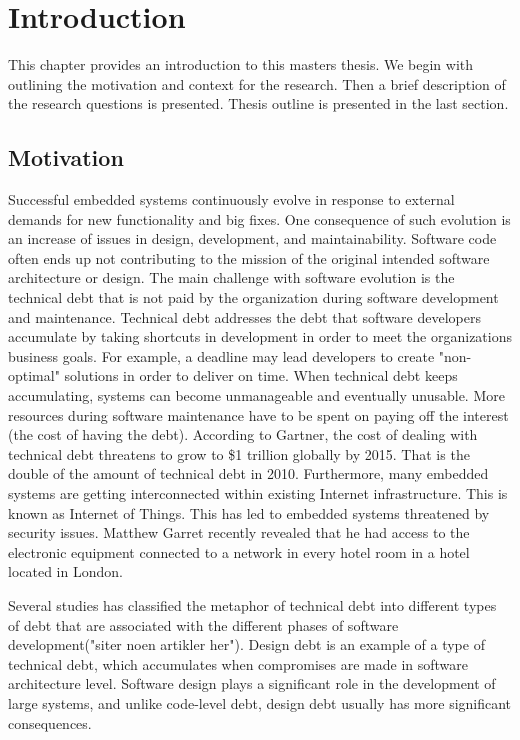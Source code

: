 
\chapter{Introduction}

This chapter provides an introduction to this masters thesis. We begin with outlining the motivation and context for the research. Then a brief description of the research questions is presented. Thesis outline is presented in the last section.


\section{Motivation}
Successful embedded systems continuously evolve in response to external demands for new functionality and big fixes\cite{graaf2003embedded}. One consequence of such evolution is an increase of issues in design, development, and maintainability\cite{7381510}. Software code often ends up not contributing to the mission of the original intended software architecture or design. The main challenge with software evolution is the technical debt that is not paid by the organization during software development and maintenance. Technical debt addresses the debt that software developers accumulate by taking shortcuts in development in order to meet the organizations business goals. For example, a deadline may lead developers to create "non-optimal" solutions in order to deliver on time. When technical debt keeps accumulating, systems can become unmanageable and eventually unusable. More resources during software maintenance have to be spent on paying off the interest (the cost of having the debt). According to Gartner\cite{gartner2010}, the cost of dealing with technical debt threatens to grow to \$1 trillion globally by 2015. That is the double of the amount of technical debt in 2010. Furthermore, many embedded systems are getting interconnected within existing Internet infrastructure. This is known as Internet of Things. This has led to embedded systems threatened by security issues. Matthew Garret recently revealed that he had access to the electronic equipment connected to a network in every hotel room in a hotel located in London.

Several studies has classified the metaphor of technical debt into different types of debt that are associated with the different phases of software development("siter noen artikler her"). Design debt is an example of a type of technical debt, which accumulates when compromises are made in software architecture level. Software design plays a significant role in the development of large systems\cite{krutchen}, and unlike code-level debt, design debt usually has more significant consequences\cite{mo2013mapping}. 


